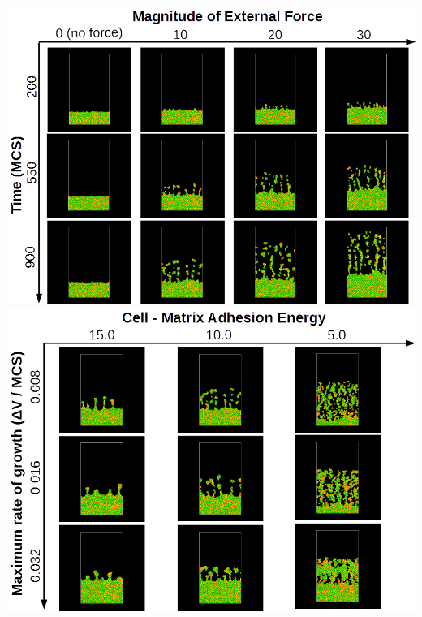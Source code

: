 \documentclass[landscape,a0paper,fontscale=0.292]{baposter}
\begin{document}
\begin{poster}
{\begin{multicols}{2}
	\includegraphics[scale=0.28]{res1}
	\columnbreak
	\includegraphics[scale=0.28]{res3}
\end{multicols}

\vspace{-0.05cm}

}
\end{poster}
\end{document}
